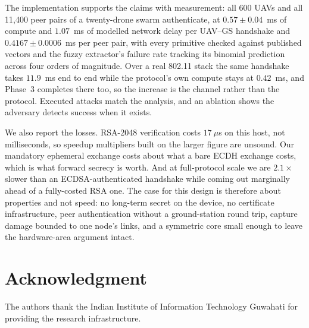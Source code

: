 \documentclass[conference]{IEEEtran}
\begin{document}
The implementation supports the claims with measurement: all 600 UAVs and all
11{,}400 peer pairs of a twenty-drone swarm authenticate, at $0.57 \pm
0.04$~ms of compute and $1.07$~ms of modelled network delay per UAV--GS
handshake and $0.4167 \pm 0.0006$~ms per peer pair, with
every primitive checked against published vectors and the fuzzy extractor's
failure rate tracking its binomial prediction across four orders of magnitude.
Over a real 802.11 stack the same handshake takes $11.9$~ms end to end while the
protocol's own compute stays at $0.42$~ms, and Phase~3 completes there too, so
the increase is the channel rather than the protocol.
Executed attacks match the analysis, and an ablation shows the adversary detects
success when it exists.

We also report the losses. RSA-2048 verification costs $17~\mu$s on this host,
not milliseconds, so speedup multipliers built on the larger figure are unsound.
Our mandatory ephemeral exchange costs about what a bare ECDH exchange costs,
which is what forward secrecy is worth. And at full-protocol scale we are
$2.1\times$ slower than an ECDSA-authenticated handshake while coming out
marginally ahead of a fully-costed RSA one. The case for this design is
therefore about properties and not speed: no long-term secret on the device, no
certificate infrastructure, peer authentication without a ground-station round
trip, capture damage bounded to one node's links, and a symmetric core small
enough to leave the hardware-area argument intact.

\section*{Acknowledgment}

The authors thank the Indian Institute of Information Technology Guwahati for
providing the research infrastructure.
\end{document}
